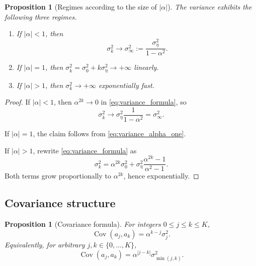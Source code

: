 \documentclass[11pt]{article}
\numberwithin{equation}{section}
\newtheorem{proposition}[theorem]{Proposition}
\theoremstyle{definition}
\theoremstyle{remark}
\newcommand{\Cov}{\operatorname{Cov}}
\begin{document}
\begin{proposition}[Regimes according to the size of \texorpdfstring{$|\alpha|$}{|alpha|}]\label{prop:regimes}
The variance exhibits the following three regimes.
\begin{enumerate}[label=(\roman*),leftmargin=1.2cm]
\item If $|\alpha|<1$, then
\[
\sigma_k^2\to \sigma_\infty^2:=\frac{\sigma_\eta^2}{1-\alpha^2}.
\]
\item If $|\alpha|=1$, then $\sigma_k^2=\sigma_0^2+k\sigma_\eta^2\to+\infty$ linearly.
\item If $|\alpha|>1$, then $\sigma_k^2\to+\infty$ exponentially fast.
\end{enumerate}
\end{proposition}

\begin{proof}
If $|\alpha|<1$, then $\alpha^{2k}\to 0$ in \eqref{eq:variance_formula}, so
\[
\sigma_k^2\to \sigma_\eta^2\frac{1}{1-\alpha^2}=\sigma_\infty^2.
\]

If $|\alpha|=1$, the claim follows from \eqref{eq:variance_alpha_one}.

If $|\alpha|>1$, rewrite \eqref{eq:variance_formula} as
\[
\sigma_k^2=\alpha^{2k}\sigma_0^2+\sigma_\eta^2\frac{\alpha^{2k}-1}{\alpha^2-1}.
\]
Both terms grow proportionally to $\alpha^{2k}$, hence exponentially.
\end{proof}

\subsection{Covariance structure}

\begin{proposition}[Covariance formula]\label{prop:cov_formula}
For integers $0\leq j\leq k\leq K$,
\begin{equation}\label{eq:ordered_cov}
\Cov(a_j,a_k)=\alpha^{k-j}\sigma_j^2.
\end{equation}
Equivalently, for arbitrary $j,k\in\{0,\dots,K\}$,
\begin{equation}\label{eq:cov_formula}
\Cov(a_j,a_k)=\alpha^{|j-k|}\sigma_{\min(j,k)}^2.
\end{equation}
\end{proposition}
\end{document}
